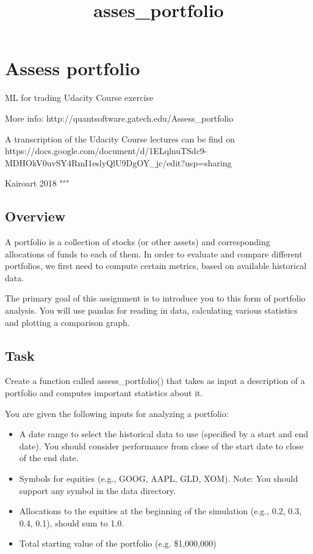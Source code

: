 \documentclass[11pt]{article}
\title{asses\_portfolio}
\providecommand{\tightlist}{%
      \setlength{\itemsep}{0pt}\setlength{\parskip}{0pt}}
\begin{document}
    
    
    \maketitle
    
    

    
    \section{Assess portfolio}\label{assess-portfolio}

ML for trading Udacity Course exercise

More info: http://quantsoftware.gatech.edu/Assess\_portfolio

A transcription of the Udacity Course lectures can be find on
https://docs.google.com/document/d/1ELqlnuTSdc9-MDHOkV0uvSY4RmI1eslyQlU9DgOY\_jc/edit?usp=sharing

Kairoart 2018 """

    \subsection{Overview}\label{overview}

A portfolio is a collection of stocks (or other assets) and
corresponding allocations of funds to each of them. In order to evaluate
and compare different portfolios, we first need to compute certain
metrics, based on available historical data.

The primary goal of this assignment is to introduce you to this form of
portfolio analysis. You will use pandas for reading in data, calculating
various statistics and plotting a comparison graph.

    \subsection{Task}\label{task}

Create a function called assess\_portfolio() that takes as input a
description of a portfolio and computes important statistics about it.

You are given the following inputs for analyzing a portfolio:

\begin{itemize}
\tightlist
\item
  A date range to select the historical data to use (specified by a
  start and end date). You should consider performance from close of the
  start date to close of the end date.
\item
  Symbols for equities (e.g., GOOG, AAPL, GLD, XOM). Note: You should
  support any symbol in the data directory.
\item
  Allocations to the equities at the beginning of the simulation (e.g.,
  0.2, 0.3, 0.4, 0.1), should sum to 1.0.
\item
  Total starting value of the portfolio (e.g. \$1,000,000)
\end{itemize}
\end{document}
